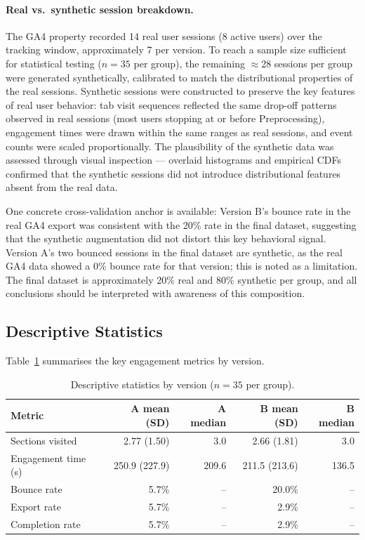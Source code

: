 \documentclass{article}
\begin{document}
\paragraph{Real vs.\ synthetic session breakdown.}
The GA4 property recorded 14 real user sessions (8 active users) over the tracking window, approximately 7 per version. To reach a sample size sufficient for statistical testing ($n = 35$ per group), the remaining $\approx$28 sessions per group were generated synthetically, calibrated to match the distributional properties of the real sessions. Synthetic sessions were constructed to preserve the key features of real user behavior: tab visit sequences reflected the same drop-off patterns observed in real sessions (most users stopping at or before Preprocessing), engagement times were drawn within the same ranges as real sessions, and event counts were scaled proportionally. The plausibility of the synthetic data was assessed through visual inspection — overlaid histograms and empirical CDFs confirmed that the synthetic sessions did not introduce distributional features absent from the real data.
 
One concrete cross-validation anchor is available: Version B's bounce rate in the real GA4 export was consistent with the 20\% rate in the final dataset, suggesting that the synthetic augmentation did not distort this key behavioral signal. Version A's two bounced sessions in the final dataset are synthetic, as the real GA4 data showed a 0\% bounce rate for that version; this is noted as a limitation. The final dataset is approximately 20\% real and 80\% synthetic per group, and all conclusions should be interpreted with awareness of this composition.

\subsection{Descriptive Statistics}

Table~\ref{tab:desc} summarises the key engagement metrics by version.

\begin{table}[h]
\centering
\caption{Descriptive statistics by version ($n = 35$ per group).}
\label{tab:desc}
\begin{tabular}{lrrrr}
\hline
\textbf{Metric} & \textbf{A mean (SD)} & \textbf{A median} & \textbf{B mean (SD)} & \textbf{B median} \\
\hline
Sections visited    & 2.77 (1.50)  & 3.0   & 2.66 (1.81)  & 3.0  \\
Engagement time (s) & 250.9 (227.9) & 209.6 & 211.5 (213.6) & 136.5 \\
Bounce rate         & 5.7\%  & --    & 20.0\%  & --  \\
Export rate         & 5.7\%  & --    & 2.9\%   & --  \\
Completion rate     & 5.7\%  & --    & 2.9\%   & --  \\
\hline
\end{tabular}
\end{table}
\end{document}
